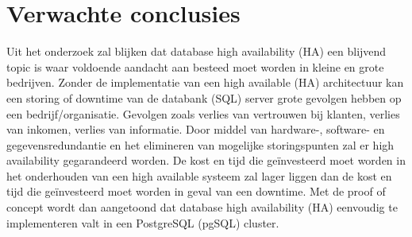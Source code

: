 \section{Verwachte conclusies}
\label{sec:verwachte_conclusies}
Uit het onderzoek zal blijken dat database high availability (HA) een blijvend topic is waar voldoende aandacht aan besteed moet worden in kleine en grote bedrijven. 
Zonder de implementatie van een high available (HA) architectuur kan een storing of downtime van de databank (SQL) server  grote gevolgen hebben op een bedrijf/organisatie. Gevolgen zoals verlies van vertrouwen bij klanten, verlies van inkomen, verlies van informatie. Door middel van hardware-, software- en gegevensredundantie en het elimineren van mogelijke storingspunten zal er high availability gegarandeerd worden.
De kost en tijd die geïnvesteerd moet worden in het onderhouden van een high available systeem zal lager liggen dan de kost en tijd die geïnvesteerd moet worden in geval van een downtime. 
Met de proof of concept wordt dan aangetoond dat database high availability (HA) eenvoudig te implementeren valt in een PostgreSQL (pgSQL) cluster.


